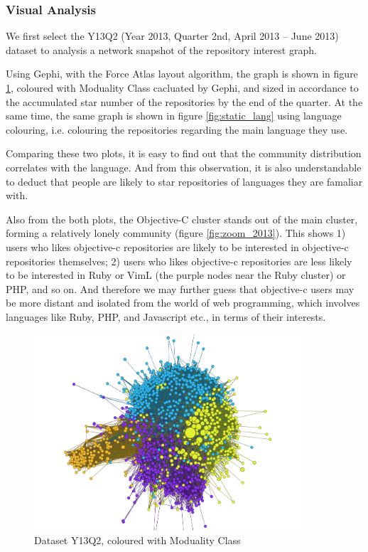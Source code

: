 \documentclass[11pt]{article}
\begin{document}
\subsubsection{Visual Analysis}
We first select the Y13Q2 (Year 2013, Quarter 2nd, April 2013 -- June 2013) dataset to analysis a network snapshot of the repository interest graph.

Using Gephi, with the Force Atlas layout algorithm, the graph is shown in figure \ref{fig:static_community}, coloured with Moduality Class cacluated by Gephi, and sized in accordance to the accumulated star number of the repositories by the end of the quarter. At the same time, the same graph is shown in figure \ref{fig:static_lang} using language colouring, i.e. colouring the repositories regarding the main language they use.

Comparing these two plots, it is easy to find out that the community distribution correlates with the language.
And from this observation, it is also understandable to deduct that people are likely to star repositories of languages they are famaliar with.

Also from the both plots, the Objective-C cluster stands out of the main cluster, forming a relatively lonely community (figure \ref{fig:zoom_2013}). This shows 1) users who likes objective-c repositories are likely to be interested in objective-c repositories themselves; 2) users who likes objective-c repositories are less likely to be interested in Ruby or VimL (the purple nodes near the Ruby cluster) or PHP, and so on.
And therefore we may further guess that objective-c users may be more distant and isolated from the world of web programming, which involves languages like Ruby, PHP, and Javascript etc., in terms of their interests.

\begin{figure}[htp!]
  \begin{center}
    \includegraphics[width=0.9\textwidth]{Y13Q2_community.png}
  \end{center}
  \caption{Dataset Y13Q2, coloured with Moduality Class}
  \label{fig:static_community}
\end{figure}
\end{document}
